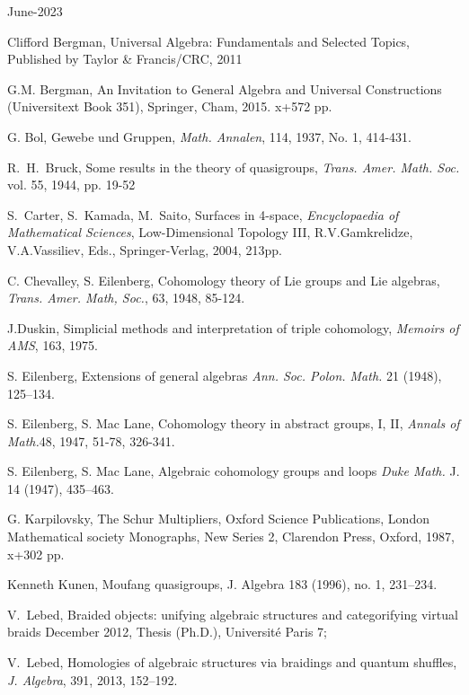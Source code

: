 \documentclass[11pt]{amsart}
\theoremstyle{definition}
\begin{document}
\begin{thebibliography}{June-2023}

 Clifford Bergman, Universal Algebra: Fundamentals and Selected Topics, Published by Taylor \& Francis/CRC, 2011

 G.M. Bergman,
An Invitation to General Algebra and Universal Constructions (Universitext Book 351), Springer, Cham, 2015. x+572 pp.

 G. Bol, Gewebe und Gruppen, {\it Math. Annalen}, 114, 1937, No. 1, 414-431.

R.~H.~Bruck, Some results in the theory of quasigroups, {\it Trans. Amer. Math. Soc.} vol. 55, 1944, pp. 19-52

S.~Carter, S.~Kamada, M.~Saito, Surfaces in 4-space, {\it Encyclopaedia
of Mathematical Sciences}, Low-Dimensional Topology III, R.V.Gamkrelidze,
V.A.Vassiliev, Eds., Springer-Verlag, 2004, 213pp.

 C. Chevalley, S. Eilenberg, Cohomology theory of Lie groups and Lie algebras, {\it Trans. Amer. Math, Soc.}, 63, 1948, 85-124.

 J.Duskin,  Simplicial methods and interpretation of triple cohomology, {\it Memoirs of AMS}, 163, 1975.

 S. Eilenberg, Extensions of general algebras
{\it Ann. Soc. Polon. Math.} 21 (1948), 125–134.


 S. Eilenberg, S. Mac Lane, Cohomology theory in abstract groups, I, II, {\it Annals of Math.}48, 1947, 51-78, 326-341.

 S. Eilenberg, S. Mac Lane, 
 Algebraic cohomology groups and loops
{\it Duke Math.} J. 14 (1947), 435–463.


 G. Karpilovsky, The Schur Multipliers, Oxford Science Publications, London Mathematical society Monographs, New Series 2, Clarendon Press, Oxford, 1987, x+302 pp.

  Kenneth Kunen, Moufang quasigroups, J. Algebra 183 (1996), no. 1, 231–234.

V.~Lebed,
Braided objects: unifying algebraic structures and categorifying virtual
braids December 2012, Thesis (Ph.D.), Universit\'e Paris 7;

V.~Lebed, Homologies of algebraic structures via braidings and quantum
shuffles, {\it J. Algebra}, 391, 2013, 152–192.


\end{thebibliography}
\end{document}
